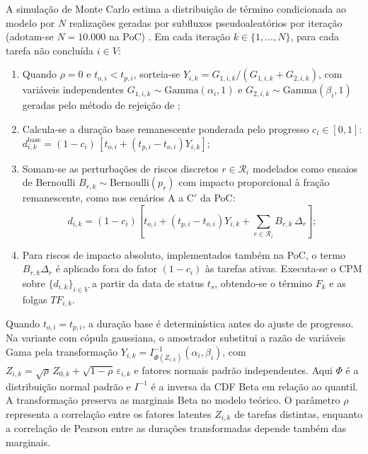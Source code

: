\documentclass[12pt,openany,oneside,a4paper,english,brazilian,sumario=tradicional]{abntex2}
\begin{document}
A simulação de Monte Carlo estima a distribuição de término condicionada ao modelo por $N$ realizações geradas por subfluxos pseudoaleatórios por iteração (adotam-se $N=10.000$ na PoC) \cite{vanslyke1963,law2015}. Em cada iteração $k \in \{1,\dots,N\}$, para cada tarefa não concluída $i \in V$:
\begin{enumerate}
  \item Quando $\rho=0$ e $t_{o,i}<t_{p,i}$, sorteia-se $Y_{i,k}=G_{1,i,k}/(G_{1,i,k}+G_{2,i,k})$, com variáveis independentes $G_{1,i,k}\sim\mathrm{Gamma}(\alpha_i,1)$ e $G_{2,i,k}\sim\mathrm{Gamma}(\beta_i,1)$ geradas pelo método de rejeição de ;
  \item Calcula-se a duração base remanescente ponderada pelo progresso $c_i \in [0,1]$: $d_{i,k}^{\mathrm{base}} = (1-c_i)\,[t_{o,i} + (t_{p,i}-t_{o,i})Y_{i,k}]$;
  \item Somam-se as perturbações de riscos discretos $r \in \mathcal{R}_i$ modelados como ensaios de Bernoulli $B_{r,k}\sim\mathrm{Bernoulli}(p_r)$ com impacto proporcional à fração remanescente, como nos cenários A a C$'$ da PoC:
  \begin{equation}
  d_{i,k} = (1-c_i)\left[t_{o,i} + (t_{p,i}-t_{o,i})Y_{i,k} + \sum_{r\in\mathcal{R}_i} B_{r,k}\,\Delta_r\right];
  \end{equation}
  \item Para riscos de impacto absoluto, implementados também na PoC, o termo $B_{r,k}\Delta_r$ é aplicado fora do fator $(1-c_i)$ às tarefas ativas. Executa-se o CPM sobre $\{d_{i,k}\}_{i\in V}$ a partir da data de status $t_s$, obtendo-se o término $F_k$ e as folgas $TF_{i,k}$.
\end{enumerate}

Quando $t_{o,i}=t_{p,i}$, a duração base é determinística antes do ajuste de progresso. Na variante com cópula gaussiana, o amostrador substitui a razão de variáveis Gama pela transformação $Y_{i,k}=I^{-1}_{\Phi(Z_{i,k})}(\alpha_i,\beta_i)$, com $Z_{i,k}=\sqrt{\rho}\,Z_{0,k}+\sqrt{1-\rho}\,\varepsilon_{i,k}$ e fatores normais padrão independentes. Aqui $\Phi$ é a distribuição normal padrão e $I^{-1}$ é a inversa da CDF Beta em relação ao quantil. A transformação preserva as marginais Beta no modelo teórico. O parâmetro $\rho$ representa a correlação entre os fatores latentes $Z_{i,k}$ de tarefas distintas, enquanto a correlação de Pearson entre as durações transformadas depende também das marginais.
\end{document}
